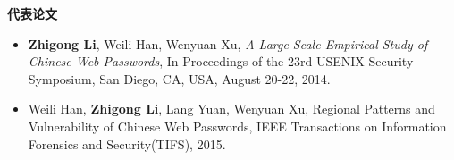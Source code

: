 \documentclass[letterpaper,10pt]{article}
\newcommand{\resheading}[1]{{\large \colorbox{mygrey}{\begin{minipage}{\textwidth}{\textbf{#1 \vphantom{p\^{E}}}}\end{minipage}}}}
\begin{document}




\resheading{代表论文}
\begin{itemize}
 \item
 \textbf{Zhigong Li}, Weili Han, Wenyuan Xu, \emph{A Large-Scale Empirical Study of Chinese Web Passwords}, In Proceedings of the 23rd {USENIX} Security Symposium, San Diego, CA, USA, August 20-22, 2014.
 \item Weili Han, \textbf{Zhigong Li}, Lang Yuan, Wenyuan Xu, Regional Patterns and Vulnerability of Chinese Web Passwords, IEEE Transactions on Information Forensics and Security(TIFS), 2015.

\end{itemize}




\end{document}
